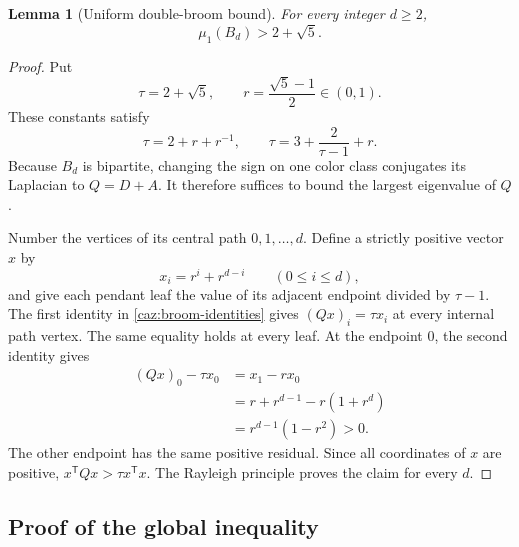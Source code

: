 \documentclass[11pt,a4paper]{article}
\numberwithin{equation}{section}
\newtheorem{lemma}[theorem]{Lemma}
\theoremstyle{remark}
\begin{document}
\begin{lemma}[Uniform double-broom bound]
\label{caz:broom}
For every integer $d\ge2$,
\[
 \mu_1(B_d)>2+\sqrt5.
\]
\end{lemma}
\begin{proof}
Put
\[
 \tau=2+\sqrt5,
 \qquad r=\frac{\sqrt5-1}{2}\in(0,1).
\]
These constants satisfy
\begin{equation}
 \tau=2+r+r^{-1},
 \qquad
 \tau=3+\frac{2}{\tau-1}+r.
 \label{caz:broom-identities}
\end{equation}
Because $B_d$ is bipartite, changing the sign on one color class
conjugates its Laplacian to $Q=D+A$. It therefore suffices to bound
the largest eigenvalue of $Q$.

Number the vertices of its central path $0,1,\ldots,d$. Define a
strictly positive vector $x$ by
\[
 x_i=r^i+r^{d-i}\qquad(0\le i\le d),
\]
and give each pendant leaf the value of its adjacent endpoint
divided by $\tau-1$. The first identity in
\eqref{caz:broom-identities} gives $(Qx)_i=\tau x_i$ at every
internal path vertex. The same equality holds at every leaf. At
the endpoint $0$, the second identity gives
\begin{align*}
 (Qx)_0-\tau x_0
 &=x_1-rx_0\\
 &=r+r^{d-1}-r(1+r^d)\\
 &=r^{d-1}(1-r^2)>0.
\end{align*}
The other endpoint has the same positive residual. Since all
coordinates of $x$ are positive,
$x^{\mathsf T}Qx>\tau x^{\mathsf T}x$. The Rayleigh principle proves
the claim for every $d$.
\end{proof}

\subsection{Proof of the global inequality}
\end{document}
